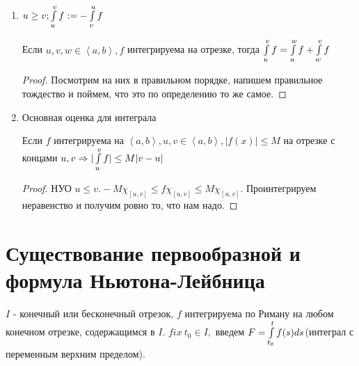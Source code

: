 \documentclass[12pt]{report}
\begin{document}
\begin{prop}
\begin{enumerate}
\begin{proof}
Если $I_1 \cap I_2 = \{c\} \Rightarrow f \chi_{I_1 \cup I_2} = f \chi_{I_1} + f \chi_{I_2} - f\chi_{\{c\}}$, и из Note следует что надо.
\end{proof}

\begin{cor}
Если $I = \left<c, d\right> \subset \left< a, b\right>$, то $J(f\chi_{I})$ на зависит от того, включены ли концы в интервал. 

$I = \left<c, d\right>, c \le d ~J(f \Xi_I) = \ilim_{c}^d{f} = \ilim_{c}^d{f(x)dx}$

Мы доказали, что интеграл аддитивен по отрезку, то есть 
$$c \le d \le e \Rightarrow \ilim_{c}^e{f} = \ilim_{c}^d{f} + \ilim_{d}^e{f}$$
\end{cor}

\item
\begin{defn}
$u \ge v; \int\limits_{u}^v{f} := -\int\limits_v^u{f}$
\end{defn}

Если $u, v, w \in \left< a, b\right>, f$ интегрируема на отрезке, тогда $\int\limits_u^v{f} = \int\limits_u^w{f} + \int\limits_w^v{f}$
\begin{proof}
Посмотрим на них в правильном порядке, напишем правильное тождество и поймем, что это по определению то же самое.
\end{proof}

\item Основная оценка для интеграла

Если $f$ интегрируема на $\left<a, b\right>, u, v \in \left<a, b\right>, |f(x)| \le M$ на отрезке с концами $u, v \Rightarrow |\int\limits_u^v{f}| \le M|v - u|$

\begin{proof}
НУО $u \le v. -M\chi_{[u, v]} \le f\chi_{[u, v]} \le M\chi_{[u, v]}$. Проинтегрируем неравенство и получим ровно то, что нам надо. 
\end{proof}
\end{enumerate}
\end{prop}

\section{Существование первообразной и формула Ньютона-Лейбница}

$I$ - конечный или бесконечный отрезок, $f$ интегрируема по Риману на любом конечном отрезке, содержащимся в $I$. $fix ~t_0 \in I,$ введем $F = \int\limits_{t_0}^t{f(s)ds}$(интеграл с переменным верхним пределом).
\end{document}
